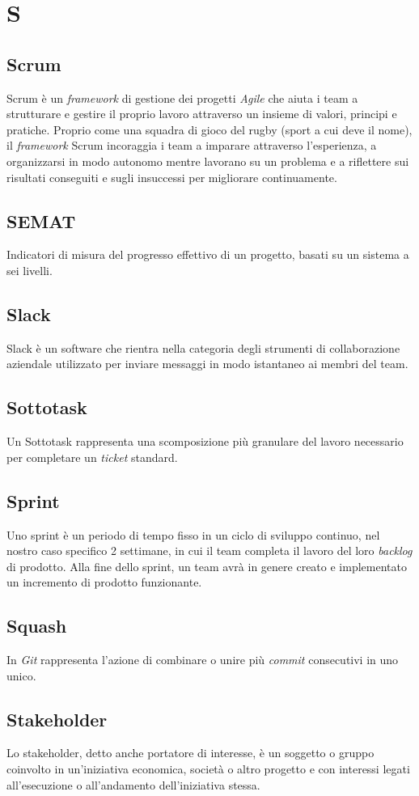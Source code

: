 \chapter{S}

\section{Scrum}
Scrum è un \emph{framework} di gestione dei progetti \emph{Agile} che aiuta i team a strutturare e gestire il proprio lavoro attraverso un insieme di valori, principi e pratiche. Proprio come una squadra di gioco del rugby (sport a cui deve il nome), il \emph{framework} Scrum incoraggia i team a imparare attraverso l'esperienza, a organizzarsi in modo autonomo mentre lavorano su un problema e a riflettere sui risultati conseguiti e sugli insuccessi per migliorare continuamente.

\section{SEMAT}
Indicatori di misura del progresso effettivo di un progetto, basati su un sistema a sei livelli.

\section{Slack}
Slack è un software che rientra nella categoria degli strumenti di collaborazione aziendale utilizzato per inviare messaggi in modo istantaneo ai membri del team.

\section{Sottotask}
Un Sottotask rappresenta una scomposizione più granulare del lavoro necessario per completare un \emph{ticket} standard.

\section{Sprint}
Uno sprint è un periodo di tempo fisso in un ciclo di sviluppo continuo, nel nostro caso specifico 2 settimane, in cui il team completa il lavoro del loro \emph{backlog} di prodotto. Alla fine dello sprint, un team avrà in genere creato e implementato un incremento di prodotto funzionante.

\section{Squash}
In \emph{Git} rappresenta l'azione di combinare o unire più \emph{commit} consecutivi in uno unico.

\section{Stakeholder}
Lo stakeholder, detto anche portatore di interesse, è un soggetto o gruppo coinvolto in un'iniziativa economica, società o altro progetto e con interessi legati all’esecuzione o all’andamento dell'iniziativa stessa.

